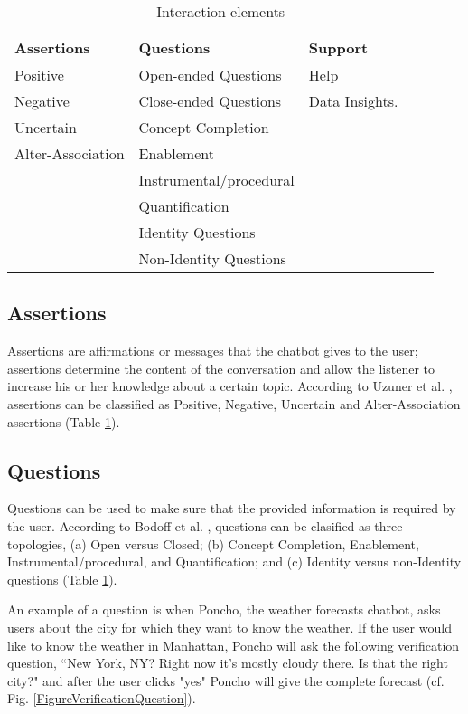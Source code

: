 \documentclass[a4paper,10pt]{article}
\begin{document}
\begin{table}[]
\centering
\begin{tabular}{lllll}
\hline
\textbf{Assertions}    & \textbf{Questions}     & \textbf{Support}   \\
\hline
Positive & Open-ended Questions & Help      \\
Negative         &   Close-ended Questions       & Data Insights.  \\
Uncertain             &   Concept Completion      &       \\
Alter-Association                    &   Enablement    &       \\
                       &  Instrumental/procedural  &       \\    
                     & Quantification  &       \\    
                       & Identity Questions  &       \\    
                      &  Non-Identity Questions  &       \\    
     \hline                   
\end{tabular}
\caption{Interaction elements}
\label{InteractionElementsTable}
\end{table}

\subsection{Assertions}
Assertions are affirmations or messages that the chatbot gives to the user; assertions determine the content of the conversation and allow the listener to increase his or her knowledge about a certain topic. According to Uzuner et al. \cite{uzuner2009machine}, assertions can be classified as Positive, Negative, Uncertain and Alter-Association assertions (Table \ref{InteractionElementsTable}).  

\subsection{Questions}
Questions can be used to make sure that the provided information is required by the user. According to Bodoff et al. \cite{bodoff2016question}, questions can be clasified as three topologies, (a) Open versus Closed; (b) Concept Completion, Enablement, Instrumental/procedural, and Quantification; and (c) Identity versus non-Identity questions (Table \ref{InteractionElementsTable}). 

An example of a question is when Poncho, the weather forecasts chatbot, asks users about the city for which they want to know the weather. If the user would like to know the weather in Manhattan, Poncho will ask the following verification question, ``New York, NY? Right now it's mostly cloudy there. Is that the right city?" and after the user clicks "yes" Poncho will give the complete forecast (cf. Fig. \ref{FigureVerificationQuestion}). 
\end{document}
